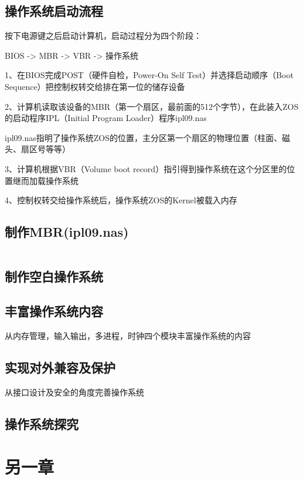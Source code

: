 \documentclass{swfcthesis}
\begin{document}
\section{操作系统启动流程}
按下电源键之后启动计算机，启动过程分为四个阶段\cite{hbt}：
	\begin{center}BIOS -> MBR -> VBR -> 操作系统\end{center}
	
	1、在BIOS完成POST（硬件自检，Power-On Self Test）并选择启动顺序（Boot Sequence）把控制权转交给排在第一位的储存设备
	
	2、计算机读取该设备的MBR（第一个扇区，最前面的512个字节），在此装入ZOS的启动程序IPL（Initial Program Loader）程序ipl09.nas
	
	\hspace*{1cm}ipl09.nas指明了操作系统ZOS的位置，主分区第一个扇区的物理位置（柱面、磁头、扇区号等等）

	3、计算机根据VBR（Volume boot record）指引得到操作系统在这个分区里的位置继而加载操作系统
	
	4、控制权转交给操作系统后，操作系统ZOS的Kernel被载入内存
\section{制作MBR(ipl09.nas)}
\begin{verbatim}

\end{verbatim}
\section{制作空白操作系统}

\section{丰富操作系统内容}
从内存管理，输入输出，多进程，时钟四个模块丰富操作系统的内容
\section{实现对外兼容及保护}
从接口设计及安全的角度完善操作系统
\section{操作系统探究}

\chapter{另一章}
\end{document}

